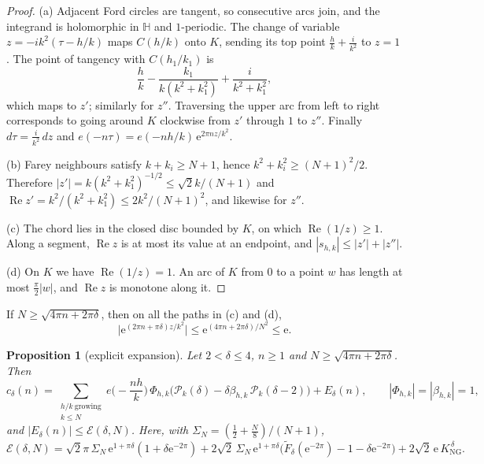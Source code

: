 \documentclass[11pt]{amsart}
\newtheorem{proposition}[theorem]{Proposition}
\theoremstyle{remark}
\theoremstyle{definition}
\newcommand{\HH}{\mathbb H}
\newcommand{\cP}{\mathcal P}
\newcommand{\cE}{\mathcal E}
\newcommand{\Rea}{\operatorname{Re}}
\newcommand{\e}{\mathrm e}
\newcommand{\KNG}{K_{\mathrm{NG}}}
\begin{document}
\begin{proof}
(a) Adjacent Ford circles are tangent, so consecutive arcs join, and the integrand is holomorphic in $\HH$ and $1$-periodic. The change of variable $z=-ik^2(\tau-h/k)$ maps $C(h/k)$ onto $K$, sending its top point $\frac hk+\frac i{k^2}$ to $z=1$. The point of tangency with $C(h_1/k_1)$ is
\[
\frac hk-\frac{k_1}{k(k^2+k_1^2)}+\frac i{k^2+k_1^2},
\]
which maps to $z'$; similarly for $z''$. Traversing the upper arc from left to right corresponds to going around $K$ clockwise from $z'$ through $1$ to $z''$. Finally $d\tau=\frac i{k^2}\,dz$ and $e(-n\tau)=e(-nh/k)\,\e^{2\pi nz/k^2}$.

(b) Farey neighbours satisfy $k+k_i\ge N+1$, hence $k^2+k_i^2\ge(N+1)^2/2$. Therefore $|z'|=k(k^2+k_1^2)^{-1/2}\le\sqrt2k/(N+1)$ and $\Rea z'=k^2/(k^2+k_1^2)\le2k^2/(N+1)^2$, and likewise for $z''$.

(c) The chord lies in the closed disc bounded by $K$, on which $\Rea(1/z)\ge1$. Along a segment, $\Rea z$ is at most its value at an endpoint, and $|s_{h,k}|\le|z'|+|z''|$.

(d) On $K$ we have $\Rea(1/z)=1$. An arc of $K$ from $0$ to a point $w$ has length at most $\frac\pi2|w|$, and $\Rea z$ is monotone along it.
\end{proof}

If $N\ge\sqrt{4\pi n+2\pi\delta}$, then on all the paths in (c) and (d),
\begin{equation}\label{eq:expbound}
\big|\e^{(2\pi n+\pi\delta)z/k^2}\big|\le\e^{(4\pi n+2\pi\delta)/N^2}\le\e.
\end{equation}

\begin{proposition}[explicit expansion]\label{prop:expansion}
Let $2<\delta\le4$, $n\ge1$ and $N\ge\sqrt{4\pi n+2\pi\delta}$. Then
\[
c_\delta(n)=\sum_{\substack{h/k\ \mathrm{growing}\\ k\le N}}e\Big(-\frac{nh}k\Big)\,\Phi_{h,k}\Big(\cP_k(\delta)-\delta\beta_{h,k}\,\cP_k(\delta-2)\Big)+E_\delta(n),\qquad|\Phi_{h,k}|=|\beta_{h,k}|=1,
\]
and $|E_\delta(n)|\le\cE(\delta,N)$. Here, with $\Sigma_N=(\tfrac12+\tfrac N8)/(N+1)$,
\[
\cE(\delta,N)=\sqrt2\pi\,\Sigma_N\,\e^{1+\pi\delta}(1+\delta\e^{-2\pi})+2\sqrt2\,\Sigma_N\,\e^{1+\pi\delta}\big(\widetilde F_\delta(\e^{-2\pi})-1-\delta\e^{-2\pi}\big)+2\sqrt2\,\e\,\KNG^{\,\delta}.
\]
\end{proposition}
\end{document}
